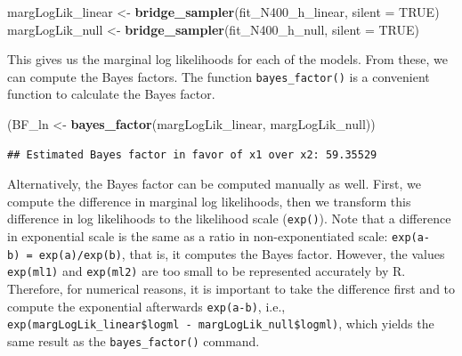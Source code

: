 \documentclass[12pt,]{krantz}
\newenvironment{Shaded}{\begin{snugshade}}{\end{snugshade}}
\newcommand{\DataTypeTok}[1]{\textcolor[rgb]{0.13,0.29,0.53}{#1}}
\newcommand{\KeywordTok}[1]{\textcolor[rgb]{0.13,0.29,0.53}{\textbf{#1}}}
\newcommand{\NormalTok}[1]{#1}
\newcommand{\OperatorTok}[1]{\textcolor[rgb]{0.81,0.36,0.00}{\textbf{#1}}}
\newcommand{\OtherTok}[1]{\textcolor[rgb]{0.56,0.35,0.01}{#1}}
\newcommand{\StringTok}[1]{\textcolor[rgb]{0.31,0.60,0.02}{#1}}
\theoremstyle{definition}
\theoremstyle{definition}
\theoremstyle{definition}
\theoremstyle{remark}
\begin{document}
\begin{Shaded}
\begin{Highlighting}[]
\NormalTok{margLogLik_linear <-}\StringTok{ }\KeywordTok{bridge_sampler}\NormalTok{(fit_N400_h_linear, }\DataTypeTok{silent =} \OtherTok{TRUE}\NormalTok{)}
\NormalTok{margLogLik_null   <-}\StringTok{ }\KeywordTok{bridge_sampler}\NormalTok{(fit_N400_h_null, }\DataTypeTok{silent =} \OtherTok{TRUE}\NormalTok{)}
\end{Highlighting}
\end{Shaded}

This gives us the marginal log likelihoods for each of the models. From these, we can compute the Bayes factors. The function \texttt{bayes\_factor()} is a convenient function to calculate the Bayes factor.

\begin{Shaded}
\begin{Highlighting}[]
\NormalTok{(BF_ln <-}\StringTok{ }\KeywordTok{bayes_factor}\NormalTok{(margLogLik_linear, margLogLik_null))}
\end{Highlighting}
\end{Shaded}

\begin{verbatim}
## Estimated Bayes factor in favor of x1 over x2: 59.35529
\end{verbatim}

Alternatively, the Bayes factor can be computed manually as well. First, we compute the difference in marginal log likelihoods, then we transform this difference in log likelihoods to the likelihood scale (\texttt{exp()}). Note that a difference in exponential scale is the same as a ratio in non-exponentiated scale: \texttt{exp(a-b)\ =\ exp(a)/exp(b)}, that is, it computes the Bayes factor. However, the values \texttt{exp(ml1)} and \texttt{exp(ml2)} are too small to be represented accurately by R. Therefore, for numerical reasons, it is important to take the difference first and to compute the exponential afterwards \texttt{exp(a-b)}, i.e., \texttt{exp(margLogLik\_linear\$logml\ -\ margLogLik\_null\$logml)}, which yields the same result as the \texttt{bayes\_factor()} command.

\begin{Shaded}
\end{Shaded}
\end{document}
